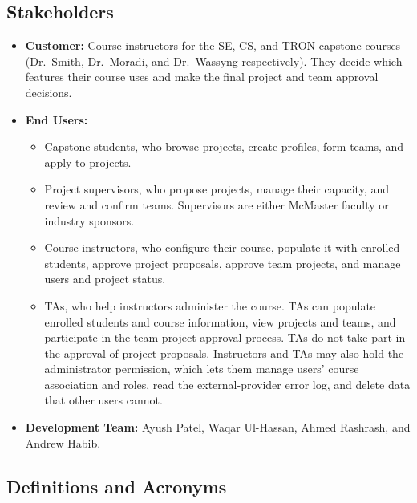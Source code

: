 \documentclass[12pt]{article}
\begin{document}
  \subsection{Stakeholders}
    \begin{itemize}
      \item \textbf{Customer:} Course instructors for the SE, CS, and TRON capstone courses
      (Dr.~Smith, Dr.~Moradi, and Dr.~Wassyng respectively). They decide which features their course
      uses and make the final project and team approval decisions.
      \item \textbf{End Users:}
        \begin{itemize}
          \item Capstone students, who browse projects, create profiles, form teams, and apply to projects.
          \item Project supervisors, who propose projects, manage their capacity, and review and confirm
          teams. Supervisors are either McMaster faculty or industry sponsors.
          \item Course instructors, who configure their course, populate it with enrolled students, approve project
          proposals, approve team projects, and manage users and project status.
          \item TAs, who help instructors administer the course. TAs can populate enrolled students and course information,
          view projects and teams, and participate in the team project approval process.
          TAs do not take part in the approval of project proposals.
          Instructors and TAs may also hold the administrator permission, which lets them manage users' course
          association and roles, read the external-provider error log, and delete data that other users cannot.
        \end{itemize}
      \item \textbf{Development Team:} Ayush Patel, Waqar Ul-Hassan, Ahmed Rashrash, and Andrew Habib.
    \end{itemize}

  \subsection{Definitions and Acronyms}

\end{document}
